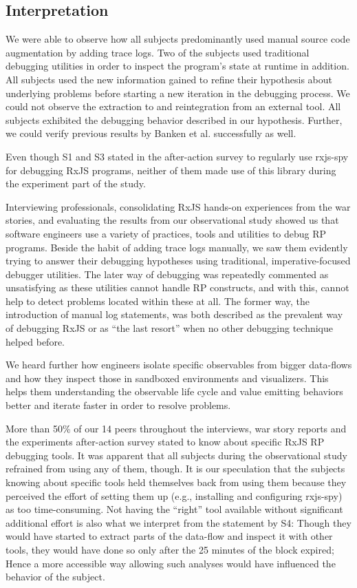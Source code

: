 \documentclass[sigplan,screen,review]{acmart}
\begin{document}
\subsection{Interpretation}

We were able to observe how all subjects predominantly used manual source code augmentation by adding trace logs. Two of the subjects used traditional debugging utilities in order to inspect the program's state at runtime in addition. All subjects used the new information gained to refine their hypothesis about underlying problems before starting a new iteration in the debugging process. We could not observe the extraction to and reintegration from an external tool. All subjects exhibited the debugging behavior described in our hypothesis. Further, we could verify previous results by Banken et al. \cite{10.1145/3180155.3180156} successfully as well.

Even though S1 and S3 stated in the after-action survey to regularly use rxjs-spy for debugging RxJS programs, neither of them made use of this library during the experiment part of the study.

Interviewing professionals, consolidating RxJS hands-on experiences from the war stories, and evaluating the results from our observational study showed us that software engineers use a variety of practices, tools and utilities to debug RP programs. Beside the habit of adding trace logs manually, we saw them evidently trying to answer their debugging hypotheses using traditional, imperative-focused debugger utilities. The later way of debugging was repeatedly commented as unsatisfying as these utilities cannot handle RP constructs, and with this, cannot help to detect problems located within these at all. The former way, the introduction of manual log statements, was both described as the prevalent way of debugging RxJS or as ``the last resort'' when no other debugging technique helped before.

We heard further how engineers isolate specific observables from bigger data-flows and how they inspect those in sandboxed environments and visualizers. This helps them understanding the observable life cycle and value emitting behaviors better and iterate faster in order to resolve problems.

More than 50\% of our 14 peers throughout the interviews, war story reports and the experiments after-action survey stated to know about specific RxJS RP debugging tools. It was apparent that all subjects during the observational study refrained from using any of them, though. It is our speculation that the subjects knowing about specific tools held themselves back from using them because they perceived the effort of setting them up (e.g., installing and configuring rxjs-spy) as too time-consuming. Not having the ``right'' tool available without significant additional effort is also what we interpret from the statement by S4: Though they would have started to extract parts of the data-flow and inspect it with other tools, they would have done so only after the 25 minutes of the block expired; Hence a more accessible way allowing such analyses would have influenced the behavior of the subject.
\end{document}
